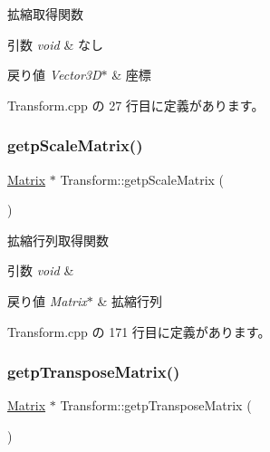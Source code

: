 拡縮取得関数 


\begin{DoxyParams}{引数}
{\em void} & なし \\
\hline
\end{DoxyParams}

\begin{DoxyRetVals}{戻り値}
{\em Vector3\+D$\ast$} & 座標 \\
\hline
\end{DoxyRetVals}


 Transform.\+cpp の 27 行目に定義があります。

\mbox{\label{class_transform_ad7b44f1e97d83f2f810e231bae2de2b5}} 
\subsubsection{\texorpdfstring{getp\+Scale\+Matrix()}{getpScaleMatrix()}}
{\footnotesize\ttfamily \mbox{\hyperlink{class_matrix}{Matrix}} $\ast$ Transform\+::getp\+Scale\+Matrix (\begin{DoxyParamCaption}{ }\end{DoxyParamCaption})}



拡縮行列取得関数 


\begin{DoxyParams}{引数}
{\em void} & \\
\hline
\end{DoxyParams}

\begin{DoxyRetVals}{戻り値}
{\em Matrix$\ast$} & 拡縮行列 \\
\hline
\end{DoxyRetVals}


 Transform.\+cpp の 171 行目に定義があります。

\mbox{\label{class_transform_aee502a42628072064f2b3d2060f2d53f}} 
\subsubsection{\texorpdfstring{getp\+Transpose\+Matrix()}{getpTransposeMatrix()}}
{\footnotesize\ttfamily \mbox{\hyperlink{class_matrix}{Matrix}} $\ast$ Transform\+::getp\+Transpose\+Matrix (\begin{DoxyParamCaption}{ }\end{DoxyParamCaption})}



